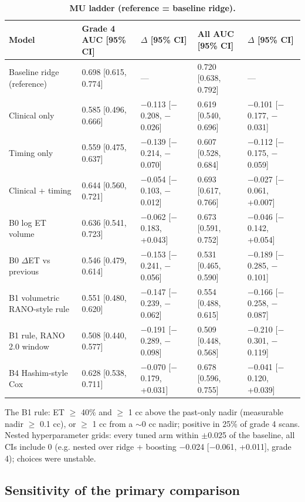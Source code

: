 \documentclass[11pt,a4paper]{article}
\begin{document}
\begin{table}[H]
\centering
\footnotesize
\renewcommand{\thetable}{S18}\renewcommand{\theHtable}{S18}
\caption{\textbf{MU ladder (reference = baseline ridge).}}
\label{tab:S18}
\begin{tabularx}{\linewidth}{@{}L R{2.75cm} R{3.5cm} R{2.75cm} R{3.5cm}@{}}
\toprule
Model & Grade 4 AUC [95\% CI] & $\Delta$ [95\% CI] & All AUC [95\% CI] & $\Delta$ [95\% CI] \\
\midrule
Baseline ridge (reference) & 0.698 [0.615, 0.774] & --- & 0.720 [0.638, 0.792] & --- \\
Clinical only & 0.585 [0.496, 0.666] & $-$0.113 [$-$0.208, $-$0.026] & 0.619 [0.540, 0.696] & $-$0.101 [$-$0.177, $-$0.031] \\
Timing only & 0.559 [0.475, 0.637] & $-$0.139 [$-$0.214, $-$0.070] & 0.607 [0.528, 0.684] & $-$0.112 [$-$0.175, $-$0.059] \\
Clinical + timing & 0.644 [0.560, 0.721] & $-$0.054 [$-$0.103, $-$0.012] & 0.693 [0.617, 0.766] & $-$0.027 [$-$0.061, +0.007] \\
B0 log ET volume & 0.636 [0.541, 0.723] & $-$0.062 [$-$0.183, +0.043] & 0.673 [0.591, 0.752] & $-$0.046 [$-$0.142, +0.054] \\
B0 $\Delta$ET vs previous & 0.546 [0.479, 0.614] & $-$0.153 [$-$0.241, $-$0.056] & 0.531 [0.465, 0.590] & $-$0.189 [$-$0.285, $-$0.101] \\
B1 volumetric RANO-style rule & 0.551 [0.480, 0.620] & $-$0.147 [$-$0.239, $-$0.062] & 0.554 [0.488, 0.615] & $-$0.166 [$-$0.258, $-$0.087] \\
B1 rule, RANO 2.0 window & 0.508 [0.440, 0.577] & $-$0.191 [$-$0.289, $-$0.098] & 0.509 [0.448, 0.568] & $-$0.210 [$-$0.301, $-$0.119] \\
B4 Hashim-style Cox & 0.628 [0.538, 0.711] & $-$0.070 [$-$0.179, +0.031] & 0.678 [0.596, 0.755] & $-$0.041 [$-$0.120, +0.039] \\
\bottomrule
\end{tabularx}
\end{table}

The B1 rule: ET $\geq$ 40\% and $\geq$ 1 cc above the past-only nadir (measurable nadir $\geq$ 0.1 cc), or
$\geq$ 1 cc from a $\sim$0 cc nadir; positive in 25\% of grade 4 scans. Nested hyperparameter grids: every
tuned arm within $\pm$0.025 of the baseline, all CIs include 0 (e.g. nested over ridge + boosting $-$0.024
[$-$0.061, +0.011], grade 4); choices were unstable.

\subsection{Sensitivity of the primary comparison}\label{sec:S12.2}
\end{document}
